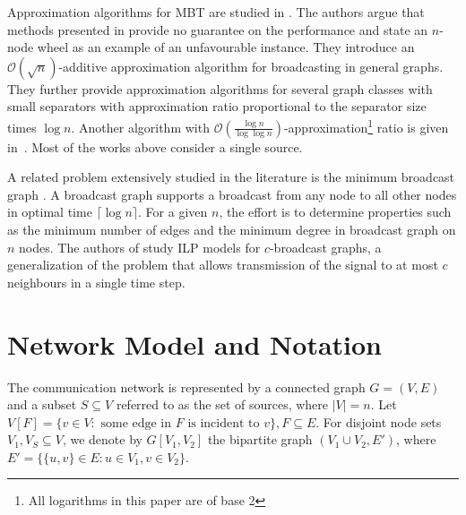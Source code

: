 Approximation algorithms for MBT are studied in \cite{kortsarz95}. 
The authors argue that methods presented in \cite{scheuermann84} provide no guarantee on the performance and state an $n$-node wheel as an example of an unfavourable instance.
They introduce an $\mathcal{O}(\sqrt{n})$-additive approximation algorithm for broadcasting in general graphs.
They further provide approximation algorithms for several graph classes with small separators with approximation ratio proportional to the separator size times $\log n$.
Another algorithm with $\mathcal{O}\left(\frac{\log n}{\log \log n}\right)$-approximation\footnote{All logarithms in this paper are of base 2} ratio is given in~\cite{elkin03}.
Most of the works above consider a single source.

A related problem extensively studied in the literature is the minimum broadcast graph \cite{grigni91,mcgarvey16}. 
A broadcast graph supports a broadcast from any node to all other nodes in optimal time $\lceil\log n\rceil$.
For a given $n$, the effort is to determine properties such as the minimum number of edges and the minimum degree in broadcast graph on $n$ nodes.
The authors of \cite{mcgarvey16} study ILP models for $c$-broadcast graphs, a generalization of the problem that allows transmission of the signal to at most $c$ neighbours in a single time step.

\section{Network Model and Notation}

The communication network is represented by a connected graph $G=(V,E)$ and a subset $S\subseteq V$ referred to as the set of sources, where $|V|=n$. 
Let $V\left[F\right]=\{v\in V:\text{ some edge in } F \text{ is incident to } v\}, F\subseteq E$.
For disjoint node sets $V_1,V_S\subseteq V$, we denote by $G\left[V_1,V_2\right]$ the bipartite graph $(V_1\cup V_2,E')$, where  $E'=\{\{u,v\}\in E: u\in V_1,v\in V_2\}$. 

